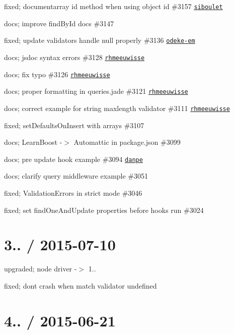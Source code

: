 \begin{DoxyItemize}
\item fixed; documentarray id method when using object id \#3157 \href{https://github.com/siboulet}{\tt siboulet}
\item docs; improve find\+By\+Id docs \#3147
\item fixed; update validators handle null properly \#3136 \href{https://github.com/odeke-em}{\tt odeke-\/em}
\item docs; jsdoc syntax errors \#3128 \href{https://github.com/rhmeeuwisse}{\tt rhmeeuwisse}
\item docs; fix typo \#3126 \href{https://github.com/rhmeeuwisse}{\tt rhmeeuwisse}
\item docs; proper formatting in queries.\+jade \#3121 \href{https://github.com/rhmeeuwisse}{\tt rhmeeuwisse}
\item docs; correct example for string maxlength validator \#3111 \href{https://github.com/rhmeeuwisse}{\tt rhmeeuwisse}
\item fixed; set\+Defaults\+On\+Insert with arrays \#3107
\item docs; Learn\+Boost -\/$>$ Automattic in package.\+json \#3099
\item docs; pre update hook example \#3094 \href{https://github.com/danpe}{\tt danpe}
\item docs; clarify query middleware example \#3051
\item fixed; Validation\+Errors in strict mode \#3046
\item fixed; set find\+One\+And\+Update properties before hooks run \#3024
\end{DoxyItemize}

\section*{3.. / 2015-\/07-\/10 }


\begin{DoxyItemize}
\item upgraded; node driver -\/$>$ 1..
\item fixed; dont crash when {\ttfamily match} validator undefined
\end{DoxyItemize}

\section*{4.. / 2015-\/06-\/21 }


